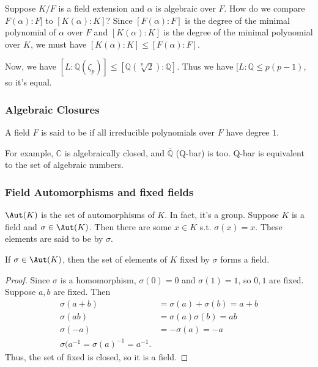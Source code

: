 \documentclass{scrartcl}
\begin{document}
Suppose $K/F$ is a field extension and $\alpha$ is algebraic over $F$. How do we compare $F(\alpha) : F]$ to $[K(\alpha) : K]$? Since $[F(\alpha):F]$ is the degree of the minimal polynomial of $\alpha$ over $F$ and $[K(\alpha) : K]$ is the degree of the minimal polynomial over $K$, we must have $[K(\alpha) : K] \le [F(\alpha) : F]$.

Now, we have $[L : \mathbb{Q}(\zeta_p)] \le [\mathbb{Q}(\sqrt[p]{2}) : \mathbb{Q}]$. Thus we have $[L:\mathbb{Q} \le p(p-1)$, so it's equal.

\subsubsection{Algebraic Closures}
\begin{definition}
	A field $F$ is said to be  if all irreducible polynomials over $F$ have degree $1$.
\end{definition}
For example, $\mathbb{C}$ is algebraically closed, and $\overline{\mathbb{Q}}$ (Q-bar) is too. Q-bar is equivalent to the set of algebraic numbers.

\subsubsection{Field Automorphisms and fixed fields}
$\Aut(K)$ is the set of automorphisms of $K$. In fact, it's a group. Suppose $K$ is a field and $\sigma \in \Aut(K)$. Then there are some $x \in K$ s.t. $\sigma(x) = x$. These elements are said to be  by $\sigma$.

\begin{proposition}
	If $\sigma \in \Aut(K)$, then the set of elements of $K$ fixed by $\sigma$ forms a field.
\end{proposition}

\begin{proof}
	Since $\sigma$ is a homomorphism, $\sigma(0) = 0$ and $\sigma(1) = 1$, so $0, 1$ are fixed. Suppose $a,b$ are fixed. Then 
	\begin{align*}
		\sigma(a+b) &= \sigma(a) + \sigma(b) = a + b \\
		\sigma(ab) &= \sigma(a) \sigma(b) = ab \\
		\sigma(-a) &= -\sigma(a) = -a \\
		\sigma(a^{-1} = \sigma(a)^{-1} = a^{-1}.
	\end{align*}
	Thus, the set of fixed is closed, so it is a field.
\end{proof}
\end{document}
